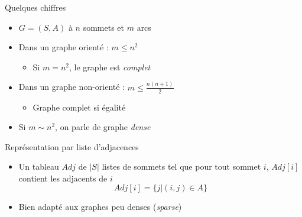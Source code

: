 \begin{frame}{Quelques chiffres}
    \begin{itemize}
        \item $G=(S,A)$ à $n$ sommets et $m$ arcs 
        \item Dans un graphe orienté : $m \leq n^2$ 
        \begin{itemize}
            \item Si $m=n^2$, le graphe est \emph{complet}
        \end{itemize}
        \item Dans un graphe non-orienté : $m \leq \frac{n(n+1)}{2}$
        \begin{itemize}
            \item Graphe complet si égalité 
        \end{itemize}
        \item Si $m \sim  n^2$, on parle de graphe \emph{dense}
    \end{itemize}
\end{frame}

\begin{frame}{Représentation par liste d'adjacences}
    \begin{itemize}
        \item Un tableau $Adj$ de $|S|$ listes de sommets tel que pour tout sommet $i$, $Adj[i]$ contient les adjacents de $i$
        \begin{equation*}
            Adj[i] = \{  j | (i,j) \in A \}
        \end{equation*}
        \item Bien adapté aux graphes peu denses (\textit{sparse})
    \end{itemize}
\end{frame}

